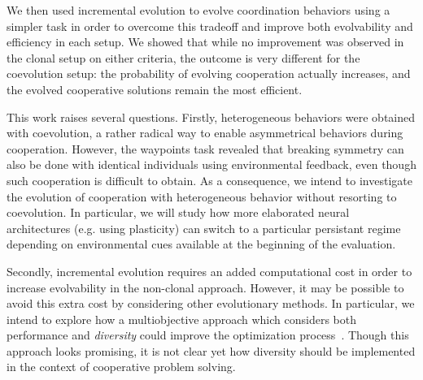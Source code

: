   We then used incremental evolution to evolve coordination behaviors using a simpler task in order to overcome this tradeoff and improve both evolvability and efficiency in each setup. We showed that while no improvement was observed in the clonal setup on either criteria, the outcome is very different for the coevolution setup: the probability of evolving cooperation actually increases, and the evolved cooperative solutions remain the most efficient.
 
  This work raises several questions. Firstly, heterogeneous behaviors were obtained with coevolution, a rather radical way to enable asymmetrical behaviors during cooperation. However, the waypoints task revealed that breaking symmetry can also be done with identical individuals using environmental feedback, even though such cooperation is difficult to obtain. As a consequence, we intend to investigate the evolution of cooperation with heterogeneous behavior without resorting to coevolution. In particular, we will study how more elaborated neural architectures (e.g. using plasticity) can switch to a particular persistant regime depending on environmental cues available at the beginning of the evaluation.

  Secondly, incremental evolution requires an added computational cost in order to increase evolvability in the non-clonal approach. However, it may be possible to avoid this extra cost by considering other evolutionary methods. In particular, we intend to explore how a multiobjective approach which considers both performance and \emph{diversity} could improve the optimization process~\parencite{Lehman2008, Doncieux2014}. Though this approach looks promising, it is not clear yet how diversity should be implemented in the context of cooperative problem solving.